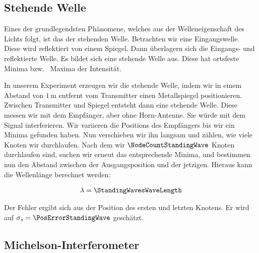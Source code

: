 \documentclass[a4paper,10pt,twocolumn]{article}
\begin{document}
    \subsection{Stehende Welle}
    
    Eines der grundlegendsten Phänomene, welches aus der Welleneigenschaft des Lichts folgt, ist das der stehenden Welle.
    Betrachten wir eine Eingangswelle.
    Diese wird reflektiert von einem Spiegel.
    Dann überlagern sich die Eingangs- und reflektierte Welle.
    Es bildet sich eine stehende Welle aus.
    Diese hat ortsfeste Minima bzw. \ Maxima der Intensität.
    
    In unserem Experiment erzeugen wir die stehende Welle, indem wir in einem Abstand von $1\, \mathrm{m}$ entfernt
    vom Transmitter einen Metallspiegel positionieren.
    Zwischen Transmitter und Spiegel entsteht dann eine stehende Welle.
    Diese messen wir mit dem Empfänger, aber ohne Horn-Antenne.
    Sie würde mit dem Signal interferieren.
    Wir variieren die Positions des Empfängers bis wir ein Minima gefunden haben.
    Nun verschieben wir ihn langsam und zählen, wie viele Knoten wir durchlaufen.
    Nach dem wir $\NodeCountStandingWave$ Knoten durchlaufen sind, suchen wir erneut das entsprechende Minima, und 
    bestimmen nun den Abstand zwischen der Ausgangsposition und der jetzigen. 
    Hieraus kann die Wellenlänge berechnet werden:
    
    \begin{align*}
        \lambda = \StandingWavesWaveLength
    \end{align*}
    
    Der Fehler ergibt sich aus der Position des ersten und letzten Knotens.
    Er wird auf $\sigma_s = \PosErrorStandingWave$ geschätzt.
    
    \subsection{Michelson-Interferometer}
\end{document}
